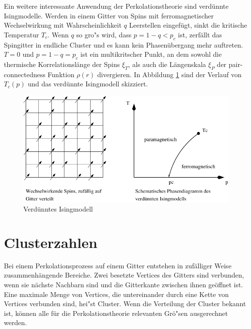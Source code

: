 Ein weitere interessante Anwendung der Perkolationstheorie sind verd\"unnte Isingmodelle. Werden in einem Gitter von Spins mit ferromagnetischer Wechselwirkung mit Wahrscheinlichkeit $q$ Leerstellen eingef\"ugt, sinkt die kritische Temperatur $T_c$. Wenn $q$ so gro"s wird, dass $p=1-q<p_c$ ist, zerf\"allt das Spingitter in endliche Cluster und es kann kein Phasen\"ubergang mehr auftreten. $T=0$ und $p=1-q=p_c$ ist ein multikritscher Punkt, an dem sowohl die thermische Korrelationsl\"ange der Spins $\xi_T$, als auch die L\"angenskala $\xi_P$ der pair-connectedness Funktion $\rho(r)$ divergieren. In Abbildung \ref{fig:diluted} sind der Verlauf von $T_c(p)$ und das verd\"unnte Isingmodell skizziert.
\begin{figure}[tbp]
  \centering
  \includegraphics{./Einleitung-figs/diluted}
  \caption{Verd\"unntes Isingmodell}
  \label{fig:diluted}
\end{figure}

\section{Clusterzahlen}
Bei einem Perkolationsprozess auf einem Gitter entstehen in zuf\"alliger Weise zusammenh\"ang\-ende Bereiche. Zwei besetzte Vertices des Gitters sind verbunden, wenn sie n\"achste Nachbarn sind und die Gitterkante zwischen ihnen ge\"offnet ist. Eine maximale Menge von Vertices, die untereinander durch eine Kette von Vertices verbunden sind, hei"st Cluster. Wenn die Verteilung der Cluster bekannt ist, k\"onnen alle f\"ur die Perkolationstheorie relevanten Gr\"o"sen ausgerechnet werden.
